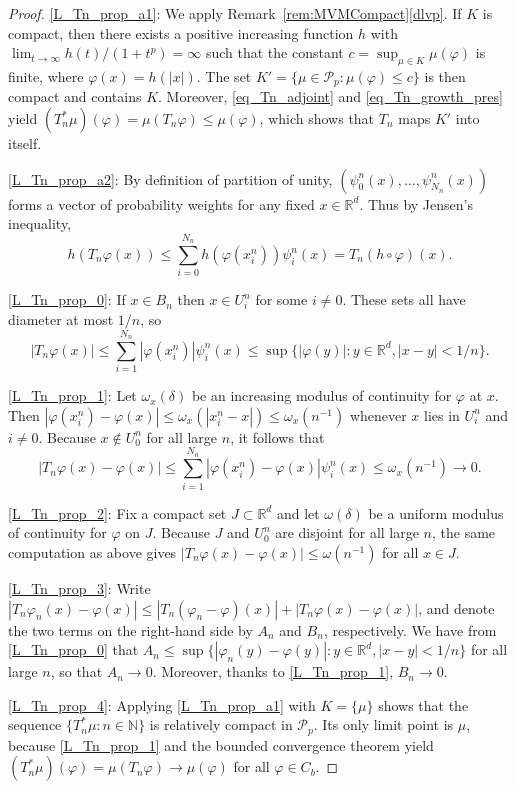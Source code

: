 \documentclass{article}
\theoremstyle{definition}
\numberwithin{equation}{section}
\numberwithin{theorem}{section}
\newcommand{\R}{\mathbb{R}}
\newcommand{\N}{{\mathbb N}}
\newcommand{\Pcal}{{\mathcal P}}
\begin{document}
\begin{proof}
\ref{L_Tn_prop_a1}: We apply Remark~\ref{rem:MVMCompact}\ref{dlvp}. If $K$ is compact, then there exists a positive increasing function $h$ with $\lim_{t\to\infty}h(t)/(1+t^p)=\infty$ such that the constant $c=\sup_{\mu\in K}\mu(\varphi)$ is finite, where $\varphi(x)=h(|x|)$. The set $K'=\{\mu\in\Pcal_p\colon \mu(\varphi)\le c\}$ is then compact and contains $K$. Moreover, \eqref{eq_Tn_adjoint} and \eqref{eq_Tn_growth_pres} yield $(T_n^*\mu)(\varphi)=\mu(T_n\varphi)\le\mu(\varphi)$, which shows that $T_n$ maps $K'$ into itself.

\ref{L_Tn_prop_a2}: By definition of partition of unity, $(\psi^n_0(x),\ldots,\psi^n_{N_n}(x))$ forms a vector of probability weights for any fixed $x\in {\R^d}$. Thus by Jensen's inequality, 
$$h(T_n\varphi(x))\le\sum_{i=0}^{N_n}h(\varphi(x^n_i))\psi^n_i(x)=T_n(h\circ\varphi)(x).$$

\ref{L_Tn_prop_0}: If $x\in B_n$ then $x\in U^n_i$ for some $i\ne0$. These sets all have diameter at most $1/n$, so
$$|T_n\varphi(x)|\le\sum_{i=1}^{N_n} |\varphi(x^n_i)|\psi^n_i(x)\le\sup\{|\varphi(y)|\colon y\in {\R^d}, |x-y|<1/n\}.$$

\ref{L_Tn_prop_1}: Let $\omega_x(\delta)$ be an increasing modulus of continuity for $\varphi$ at $x$. Then $|\varphi(x^n_i)-\varphi(x)|\le\omega_x(|x^n_i-x|)\le\omega_x(n^{-1})$ whenever $x$ lies in $U^n_i$ and $i\ne0$. Because $x\notin U^n_0$ for all large $n$, it follows that
\[
|T_n\varphi(x) - \varphi(x)| \le \sum_{i=1}^{N_n} |\varphi(x^n_i) - \varphi(x)|\psi^n_i(x) \le \omega_x(n^{-1}) \to 0.
\]

\ref{L_Tn_prop_2}: Fix a compact set $J\subset {\R^d}$ and let $\omega(\delta)$ be a uniform modulus of continuity for $\varphi$ on $J$. Because $J$ and $U^n_0$ are disjoint for all large $n$, the same computation as above gives $|T_n\varphi(x) - \varphi(x)| \le \omega(n^{-1})$ for all $x\in J$.

\ref{L_Tn_prop_3}: Write $|T_n\varphi_n(x)-\varphi(x)| \le |T_n(\varphi_n-\varphi)(x)| + |T_n\varphi(x)-\varphi(x)|$, and denote the two terms on the right-hand side by $A_n$ and $B_n$, respectively. We have from \ref{L_Tn_prop_0} that $A_n\le
\sup\{|\varphi_n(y)-\varphi(y)|\colon y\in {\R^d}, |x-y|<1/n\}
$ for all large $n$, so that $A_n\to0$. Moreover, thanks to \ref{L_Tn_prop_1}, $B_n\to0$.

\ref{L_Tn_prop_4}: Applying \ref{L_Tn_prop_a1} with $K=\{\mu\}$ shows that the sequence $\{T_n^*\mu\colon n\in\N\}$ is relatively compact in $\Pcal_p$. Its only limit point is $\mu$, because \ref{L_Tn_prop_1} and the bounded convergence theorem yield $(T_n^*\mu)(\varphi)=\mu(T_n\varphi)\to\mu(\varphi)$ for all $\varphi\in C_b$.
\end{proof}
\end{document}
